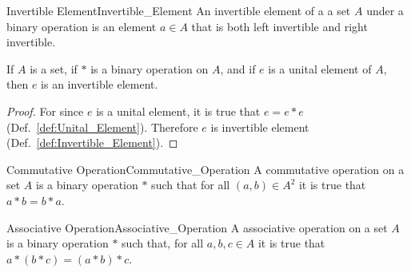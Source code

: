     \begin{fdefinition}{Invertible Element}{Invertible_Element}
        An invertible element of a a \gls{set} $A$ under a
        \gls{binary operation} is an element $a\in{A}$ that is both
        left invertible and right invertible.
    \end{fdefinition}
    \begin{theorem}
        \label{thm:Unital_Elements_Are_Invertible}%
        If $A$ is a set, if $*$ is a binary operation on $A$, and if $e$ is a
        unital element of $A$, then $e$ is an invertible element.
    \end{theorem}
    \begin{proof}
        For since $e$ is a unital element, it is true that $e=e*e$
        (Def.~\ref{def:Unital_Element}). Therefore $e$ is invertible element
        (Def.~\ref{def:Invertible_Element}).
    \end{proof}
    \begin{fdefinition}{Commutative Operation}{Commutative_Operation}
        A \gls{commutative operation} on a \gls{set} $A$ is a
        \gls{binary operation} $*$ such that for all $(a,b)\in{A}^{2}$ it is
        true that $a*b=b*a$.
    \end{fdefinition}
    \begin{fdefinition}{Associative Operation}{Associative_Operation}
        A \gls{associative operation} on a \gls{set} $A$ is a
        \gls{binary operation} $*$ such that, for all $a,b,c\in{A}$ it is true
        that $a*(b*c)=(a*b)*c$.
    \end{fdefinition}
